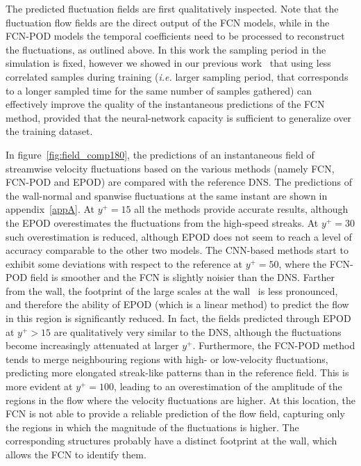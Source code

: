 The predicted fluctuation fields are first qualitatively inspected.
Note that the fluctuation flow fields are the direct output of the FCN models, while in the FCN-POD models the temporal coefficients need to be processed to reconstruct the fluctuations, as outlined above.
In this work the sampling period in the simulation is fixed, however we showed in our previous work~\citep{guastoni2020prediction} that using less correlated samples during training (\textit{i.e.} larger sampling period, that corresponds to a longer sampled time for the same number of samples gathered) can effectively improve the quality of the instantaneous predictions of the FCN method, provided that the neural-network capacity is sufficient to generalize over the training dataset.

In figure~\ref{fig:field_comp180}, the predictions of an instantaneous field of streamwise velocity fluctuations based on the various methods (namely FCN, FCN-POD and EPOD) are compared with the reference DNS.
The predictions of the wall-normal and spanwise fluctuations at the same instant are shown in appendix~\ref{appA}.
At $y^+=15$ all the methods provide accurate results, although the EPOD overestimates the fluctuations from the high-speed streaks.
At $y^+=30$ such overestimation is reduced, although EPOD does not seem to reach a level of accuracy comparable to the other two models.
The CNN-based methods start to exhibit some deviations with respect to the reference at $y^+=50$, where the FCN-POD field is smoother and the FCN is slightly noisier than the DNS.
Farther from the wall, the footprint of the large scales at the wall~\cite[through linear superposition, see][]{dogan2019quantification} is less pronounced, and therefore the ability of EPOD (which is a linear method) to predict the flow in this region is significantly reduced.
In fact, the fields predicted through EPOD at $y^{+}>15$ are qualitatively very similar to the DNS, although the fluctuations become increasingly attenuated at larger $y^{+}$.
Furthermore, the FCN-POD method tends to merge neighbouring regions with high- or low-velocity fluctuations, predicting more elongated streak-like patterns than in the reference field.
This is more evident at $y^+=100$, leading to an overestimation of the amplitude of the regions in the flow where the velocity fluctuations are higher.
At this location, the FCN is not able to provide a reliable prediction of the flow field, capturing only the regions in which the magnitude of the fluctuations is higher.
The corresponding structures probably have a distinct footprint at the wall, which allows the FCN to identify them.

